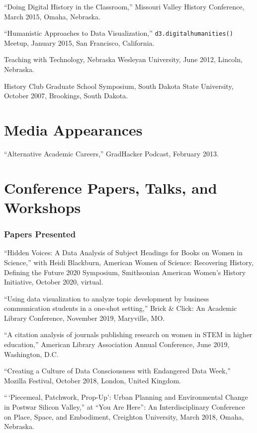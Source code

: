 ``Doing Digital History in the Classroom,'' Missouri Valley History
Conference, March 2015, Omaha, Nebraska.

``Humanistic Approaches to Data Visualization,''
\texttt{d3.digitalhumanities()} Meetup, January 2015, San Francisco,
California.

Teaching with Technology, Nebraska Wesleyan University, June 2012,
Lincoln, Nebraska.

History Club Graduate School Symposium, South Dakota State University,
October 2007, Brookings, South Dakota.

\section{Media Appearances}\label{media-appearances}

``Alternative Academic Careers,'' GradHacker Podcast, February 2013.

\section{Conference Papers, Talks, and
Workshops}\label{conference-papers-talks-and-workshops}

\subsubsection{Papers Presented}\label{papers-presented}

``Hidden Voices: A Data Analysis of Subject Headings for Books on Women
in Science,'' with Heidi Blackburn, American Women of Science:
Recovering History, Defining the Future 2020 Symposium, Smithsonian
American Women's History Initiative, October 2020, virtual.

``Using data visualization to analyze topic development by business
communication students in a one-shot setting,'' Brick \& Click: An
Academic Library Conference, November 2019, Maryville, MO.

``A citation analysis of journals publishing research on women in STEM
in higher education,'' American Library Association Annual Conference,
June 2019, Washington, D.C.

``Creating a Culture of Data Consciousness with Endangered Data Week,''
Mozilla Festival, October 2018, London, United Kingdom.

``\,`Piecemeal, Patchwork, Prop-Up': Urban Planning and Environmental
Change in Postwar Silicon Valley,'' at ``You Are Here'': An
Interdisciplinary Conference on Place, Space, and Embodiment, Creighton
University, March 2018, Omaha, Nebraska.

